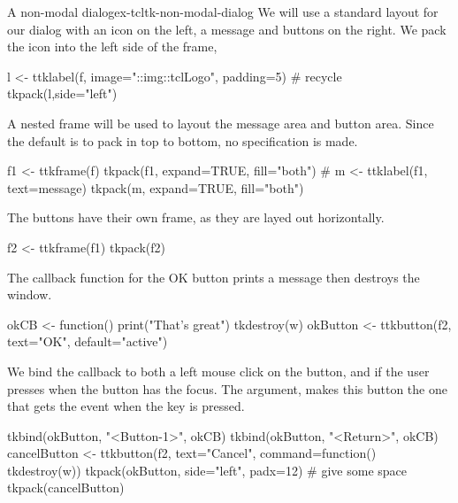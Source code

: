 \begin{example}{A non-modal dialog}{ex-tcltk-non-modal-dialog}
We will use a standard layout for our dialog with an icon on the left,
a message and buttons on the right. We pack the icon into the left side of the frame,
\begin{Schunk}
\begin{Sinput}
 l <- ttklabel(f, image="::img::tclLogo", padding=5) # recycle
 tkpack(l,side="left")
\end{Sinput}
\end{Schunk}

A nested frame will be used to layout the message area and button area. Since the  default is to pack in top to bottom, no  specification is made.
\begin{Schunk}
\begin{Sinput}
 f1 <- ttkframe(f)
 tkpack(f1, expand=TRUE, fill="both")
 #
 m <- ttklabel(f1, text=message)
 tkpack(m, expand=TRUE, fill="both")
\end{Sinput}
\end{Schunk}

The buttons have their own frame, as they are layed out horizontally. 
\begin{Schunk}
\begin{Sinput}
 f2 <- ttkframe(f1)
 tkpack(f2)
\end{Sinput}
\end{Schunk}
The callback function for the OK button prints a message then destroys the window.
\begin{Schunk}
\begin{Sinput}
 okCB <- function() {
   print("That's great")
   tkdestroy(w)
 }
 okButton <- ttkbutton(f2, text="OK", default="active")
\end{Sinput}
\end{Schunk}
We bind the callback to both a left mouse click on the button, and if the user presses  when the button has the focus. The  argument, makes this button the one that gets the  event when the  key is pressed.

\begin{Schunk}
\begin{Sinput}
 tkbind(okButton, "<Button-1>", okCB)
 tkbind(okButton, "<Return>", okCB)
 cancelButton <- ttkbutton(f2, text="Cancel", 
                           command=function() tkdestroy(w))
 tkpack(okButton, side="left", padx=12)  # give some space
 tkpack(cancelButton)
\end{Sinput}
\end{Schunk}


\end{example}
